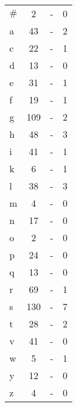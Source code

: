\documentclass[table,
12pt, %
a4paper, %
oneside, %
headinclude,footinclude, %
BCOR5mm, %
]{scrartcl}
\begin{document}
\begin{table}[htbp]
\begin{adjustbox}{center}
\begin{tabular}{|l|c|c|c|}
      $\#$    & 2         & -          & 0                         \\
      a       & 43        & -          & 2                         \\
      c       & 22        & -          & 1                         \\
      d       & 13        & -          & 0                         \\
      e       & 31        & -          & 1                         \\
      f       & 19        & -          & 1                         \\
      g       & 109       & -          & 2                         \\
      h       & 48        & -          & 3                         \\
      i       & 41        & -          & 1                         \\
      k       & 6         & -          & 1                         \\
      l       & 38        & -          & 3                         \\
      m       & 4         & -          & 0                         \\
      n       & 17        & -          & 0                         \\
      o       & 2         & -          & 0                         \\
      p       & 24        & -          & 0                         \\
      q       & 13        & -          & 0                         \\
      r       & 69        & -          & 1                         \\
      s       & 130       & -          & 7                         \\
      t       & 28        & -          & 2                         \\
      v       & 41        & -          & 0                         \\
      w       & 5         & -          & 1                         \\
      y       & 12        & -          & 0                         \\
      z       & 4         & -          & 0                         \\

      \hline
    \end{tabular}
    \label{table:ara1}
  \end{adjustbox}
\end{table}
\end{document}
